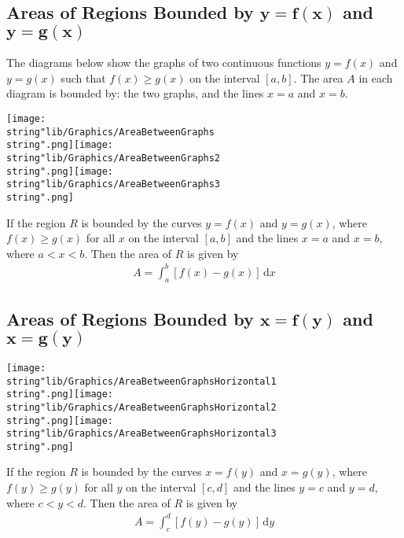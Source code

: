 \documentclass[11pt,a4paper]{book}
\begin{document}
\subsection{Areas of Regions Bounded by $\boldsymbol{y=f\left(x\right)}$ and
$\boldsymbol{y=g\left(x\right)}$}

The diagrams below show the graphs of two continuous functions $y=f(x)$
and $y=g(x)$ such that $f(x)\geq g(x)$ on the interval $[a,b]$.
The area $A$ in each diagram is bounded by: the two graphs, and the
lines $x=a$ and $x=b$.

\texttt{[image: \\string"lib/Graphics/AreaBetweenGraphs\\string".png]}\hspace{1cm}\texttt{[image: \\string"lib/Graphics/AreaBetweenGraphs2\\string".png]}\hspace{1cm}\texttt{[image: \\string"lib/Graphics/AreaBetweenGraphs3\\string".png]}

\medskip

\begin{tcolorbox}[colback=blue!5, colframe=black, boxrule=.4pt, sharpish corners]
If the region $R$ is bounded by the curves $y=f(x)$ and $y=g(x)$, where $f(x)\geq g(x)$ for all $x$ on the interval $[a,b]$ and the lines $x=a$ and $x=b$, where $a<x<b$. Then the area of $R$ is given by \begin{align*}{A={\displaystyle \int_{a}^{b}[f(x)-g(x)]\,\mathrm{d}x}}
\end{align*}
\end{tcolorbox}

\subsection{Areas of Regions Bounded by $\boldsymbol{x=f\left(y\right)}$ and
$\boldsymbol{x=g\left(y\right)}$}

\texttt{[image: \\string"lib/Graphics/AreaBetweenGraphsHorizontal1\\string".png]}\hspace{1cm}\texttt{[image: \\string"lib/Graphics/AreaBetweenGraphsHorizontal2\\string".png]}\hspace{1cm}\texttt{[image: \\string"lib/Graphics/AreaBetweenGraphsHorizontal3\\string".png]}

\medskip

\begin{tcolorbox}[colback=blue!5, colframe=black, boxrule=.4pt, sharpish corners]
If the region $R$ is bounded by the curves $x=f(y)$ and $x=g(y)$, where $f(y)\geq g(y)$ for all $y$ on the interval $[c,d]$ and the lines $y=c$ and $y=d$, where $c<y<d$. Then the area of $R$ is given by \begin{align*}{A={\displaystyle \int_{c}^{d}\left[f(y)-g(y)\right]\,\mathrm{d}y}}\end{align*}
\end{tcolorbox}
\end{document}
